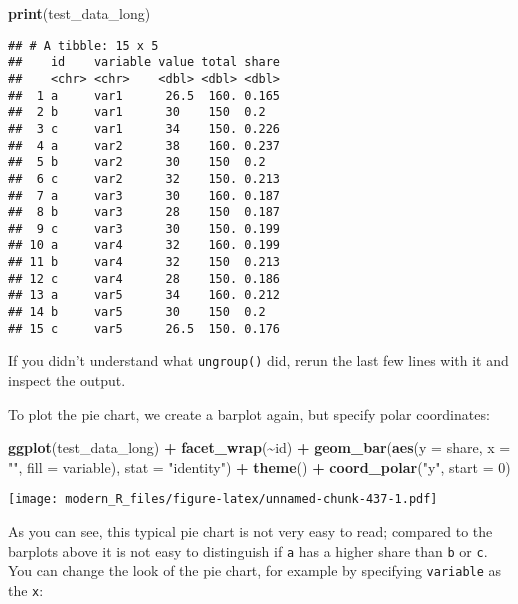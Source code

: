 \documentclass[
]{article}
\newenvironment{Shaded}{\begin{snugshade}}{\end{snugshade}}
\newcommand{\DataTypeTok}[1]{\textcolor[rgb]{0.13,0.29,0.53}{#1}}
\newcommand{\DecValTok}[1]{\textcolor[rgb]{0.00,0.00,0.81}{#1}}
\newcommand{\KeywordTok}[1]{\textcolor[rgb]{0.13,0.29,0.53}{\textbf{#1}}}
\newcommand{\NormalTok}[1]{#1}
\newcommand{\OperatorTok}[1]{\textcolor[rgb]{0.81,0.36,0.00}{\textbf{#1}}}
\newcommand{\StringTok}[1]{\textcolor[rgb]{0.31,0.60,0.02}{#1}}
\begin{document}
\begin{Shaded}
\begin{Highlighting}[]
\KeywordTok{print}\NormalTok{(test\_data\_long)}
\end{Highlighting}
\end{Shaded}

\begin{verbatim}
## # A tibble: 15 x 5
##    id    variable value total share
##    <chr> <chr>    <dbl> <dbl> <dbl>
##  1 a     var1      26.5  160. 0.165
##  2 b     var1      30    150  0.2  
##  3 c     var1      34    150. 0.226
##  4 a     var2      38    160. 0.237
##  5 b     var2      30    150  0.2  
##  6 c     var2      32    150. 0.213
##  7 a     var3      30    160. 0.187
##  8 b     var3      28    150  0.187
##  9 c     var3      30    150. 0.199
## 10 a     var4      32    160. 0.199
## 11 b     var4      32    150  0.213
## 12 c     var4      28    150. 0.186
## 13 a     var5      34    160. 0.212
## 14 b     var5      30    150  0.2  
## 15 c     var5      26.5  150. 0.176
\end{verbatim}

If you didn't understand what \texttt{ungroup()} did, rerun the last few lines with it and inspect the
output.

To plot the pie chart, we create a barplot again, but specify polar coordinates:

\begin{Shaded}
\begin{Highlighting}[]
\KeywordTok{ggplot}\NormalTok{(test\_data\_long) }\OperatorTok{+}
\StringTok{  }\KeywordTok{facet\_wrap}\NormalTok{(}\OperatorTok{\textasciitilde{}}\NormalTok{id) }\OperatorTok{+}
\StringTok{  }\KeywordTok{geom\_bar}\NormalTok{(}\KeywordTok{aes}\NormalTok{(}\DataTypeTok{y =}\NormalTok{ share, }\DataTypeTok{x =} \StringTok{""}\NormalTok{, }\DataTypeTok{fill =}\NormalTok{ variable), }\DataTypeTok{stat =} \StringTok{"identity"}\NormalTok{) }\OperatorTok{+}
\StringTok{  }\KeywordTok{theme}\NormalTok{() }\OperatorTok{+}
\StringTok{  }\KeywordTok{coord\_polar}\NormalTok{(}\StringTok{"y"}\NormalTok{, }\DataTypeTok{start =} \DecValTok{0}\NormalTok{)}
\end{Highlighting}
\end{Shaded}

\texttt{[image: modern\_R\_files/figure-latex/unnamed-chunk-437-1.pdf]}

As you can see, this typical pie chart is not very easy to read; compared to the barplots above it
is not easy to distinguish if \texttt{a} has a higher share than \texttt{b} or \texttt{c}. You can change the look of the
pie chart, for example by specifying \texttt{variable} as the \texttt{x}:
\end{document}

